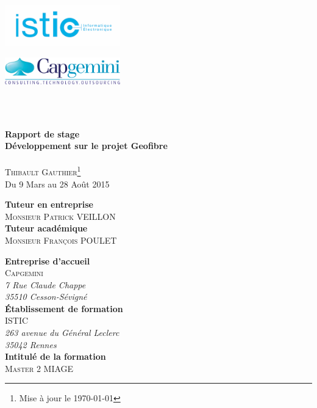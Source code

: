 \begin{titlepage}
  \begin{minipage}[t]{7cm} %
    \flushleft \includegraphics[width = 5cm]{images/logo_istic.png}
  \end{minipage}
  \hfill
  \begin{minipage}[t]{7cm}
    \flushright \includegraphics[width = 5cm]{images/logo_capgemini.png}
  \end{minipage}
  \\[2cm]
  \begin{center}
    \hr\\[0.5cm]
    {\huge\textbf{Rapport de stage }}\\[0.4cm]
    {\large\textbf{Développement sur le projet Geofibre}}\\[0.4cm]
    \hr\\[0.5cm]
    \textsc{Thibault Gauthier\footnote{Mise à jour le \today}}\\[0.4cm]
    Du 9 Mars au 28 Août 2015\\[2.5cm]
  \end{center}
  \begin{minipage}[t]{8cm} %
    \textbf{Tuteur en entreprise}\\
    \textsc{Monsieur Patrick VEILLON}\\[0.5cm]
    \textbf{Tuteur académique}\\
    \textsc{Monsieur François POULET}
  \end{minipage}
  \hfill
  \begin{minipage}[t]{8cm}
    \textbf{Entreprise d'accueil} \\
    \textsc{Capgemini}\\
    \textit{7 Rue Claude Chappe\\
    35510 Cesson-Sévigné}\\[0.5cm]
    \textbf{\'Etablissement de formation}\\
    \textsc{ISTIC\footnotemark}\\
    \textit{263 avenue du Général Leclerc\\
    35042 Rennes}\\[0.5cm]
    \textbf{Intitulé de la formation}\\
    \textsc{Master 2 MIAGE\footnotemark}

  \end{minipage}
  \addtocounter{footnote}{-2} %

\end{titlepage}

